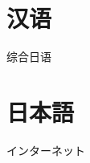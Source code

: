 \documentclass{ctexart}
\begin{document}
\section{汉语}
综合日语

\section{\gothic 日本語}
\mincho
インターネット
\end{document}
